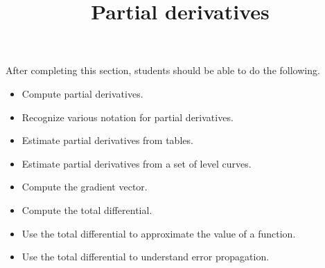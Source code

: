 \documentclass{ximera}
\title{Partial derivatives}
\begin{document}
\begin{abstract}
\end{abstract}

\maketitle

\begin{sectionOutcomes}

After completing this section, students should be able to do the following.

\begin{itemize}
\item Compute partial derivatives.
\item Recognize various notation for partial derivatives.
\item Estimate partial derivatives from tables.
\item Estimate partial derivatives from a set of level curves.
\item Compute the gradient vector.
\item Compute the total differential.
\item Use the total differential to approximate the value of a function.
\item Use the total differential to understand error propagation.
\end{itemize}

\end{sectionOutcomes}
\end{document}
